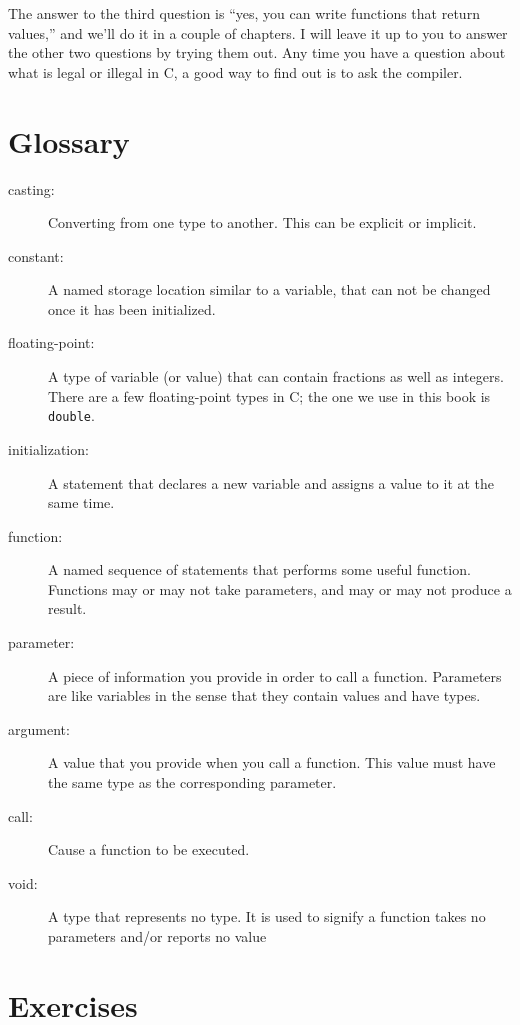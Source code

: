 The answer to the third question is ``yes, you can write functions that
return values,'' and we'll do it in a couple of chapters.  I will
leave it up to you to answer the other two questions by trying them
out.  Any time you have a question about what is legal or
illegal in C, a good way to find out is to ask the compiler.

\section{Glossary}

\begin{description}
\item[casting:]  Converting from one type to another. This can be explicit or implicit.

\item[constant:] A named storage location similar to a variable, that can not be changed
once it has been initialized.

\item[floating-point:] A type of variable (or value) that can contain
fractions as well as integers.  There are a few floating-point types
in C; the one we use in this book is {\tt double}.

\item[initialization:]  A statement that declares a new variable
and assigns a value to it at the same time.

\item[function:]  A named sequence of statements that performs some
useful function.  Functions may or may not take parameters, and may
or may not produce a result.

\item[parameter:]  A piece of information you provide
in order to call a function.  Parameters are like variables in
the sense that they contain values and have types.

\item[argument:]  A value that you provide when you call a
function.  This value must have the same type as the corresponding
parameter.

\item[call:]  Cause a function to be executed.

\item[void:] A type that represents no type. It is used to signify a function takes no parameters and/or reports no value



\end{description}


\section{Exercises}
\setcounter{exercisenum}{0}





